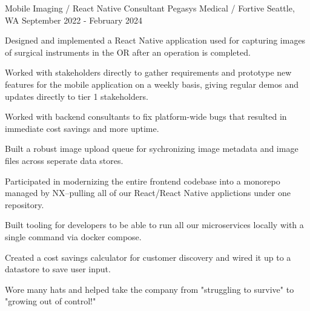 

\begin{cventries}
  \cventry
    {Mobile Imaging / React Native Consultant} %
    {Pegasys Medical / Fortive} %
    {Seattle, WA} %
    {September 2022 - February 2024} %
    {
      \begin{cvitems} %
        \item {Designed and implemented a React Native application used for capturing images of surgical instruments in the OR after an operation is completed.}
        \item {Worked with stakeholders directly to gather requirements and prototype new features for the mobile application on a weekly basis, giving regular demos and updates directly to tier 1 stakeholders.}
        \item {Worked with backend consultants to fix platform-wide bugs that resulted in immediate cost savings and more uptime.}
        \item {Built a robust image upload queue for sychronizing image metadata and image files across seperate data stores.}
        \item {Participated in modernizing the entire frontend codebase into a monorepo managed by NX--pulling all of our React/React Native applictions under one repository.}
        \item {Built tooling for developers to be able to run all our microservices locally with a single command via docker compose.}
        \item {Created a cost savings calculator for customer discovery and wired it up to a datastore to save user input.}
        \item {Wore many hats and helped take the company from "struggling to survive" to "growing out of control!"}
      \end{cvitems}
    }


\end{cventries}
